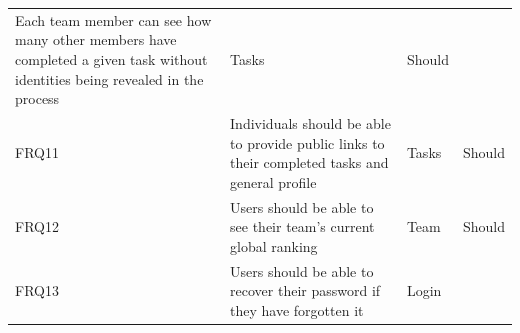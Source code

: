 \documentclass[12pt]{report}
\begin{document}
\begin{longtable}[]{@{}llll@{}}
\begin{minipage}[t]{0.64\columnwidth}
Each team member can see how many other members have completed a given
task without identities being revealed in the process\strut
\end{minipage} & \begin{minipage}[t]{0.12\columnwidth}\raggedright\strut
Tasks\strut
\end{minipage} & \begin{minipage}[t]{0.09\columnwidth}\raggedright\strut
Should\strut
\end{minipage}\tabularnewline
\begin{minipage}[t]{0.04\columnwidth}\raggedright\strut
FRQ11\strut
\end{minipage} & \begin{minipage}[t]{0.64\columnwidth}\raggedright\strut
Individuals should be able to provide public links to their completed
tasks and general profile\strut
\end{minipage} & \begin{minipage}[t]{0.12\columnwidth}\raggedright\strut
Tasks\strut
\end{minipage} & \begin{minipage}[t]{0.09\columnwidth}\raggedright\strut
Should\strut
\end{minipage}\tabularnewline
\begin{minipage}[t]{0.04\columnwidth}\raggedright\strut
FRQ12\strut
\end{minipage} & \begin{minipage}[t]{0.64\columnwidth}\raggedright\strut
Users should be able to see their team's current global ranking\strut
\end{minipage} & \begin{minipage}[t]{0.12\columnwidth}\raggedright\strut
Team\strut
\end{minipage} & \begin{minipage}[t]{0.09\columnwidth}\raggedright\strut
Should\strut
\end{minipage}\tabularnewline
\begin{minipage}[t]{0.04\columnwidth}\raggedright\strut
FRQ13\strut
\end{minipage} & \begin{minipage}[t]{0.64\columnwidth}\raggedright\strut
Users should be able to recover their password if they have forgotten
it\strut
\end{minipage} & \begin{minipage}[t]{0.12\columnwidth}\raggedright\strut
Login\strut
\end{minipage} & \begin{minipage}[t]{0.09\columnwidth}\raggedright\strut

\end{minipage}
\end{longtable}
\end{document}
